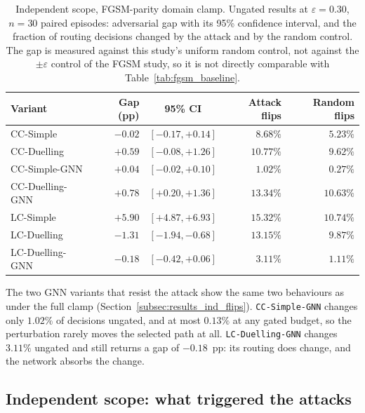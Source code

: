 \begin{table}[htbp]
  \centering
  \caption[Independent scope, FGSM-parity clamp: ungated gaps and flip rates]{%
           Independent scope, FGSM-parity domain clamp. Ungated results at
           $\varepsilon = 0.30$, $n = 30$ paired episodes: adversarial gap with its
           95\% confidence interval, and the fraction of routing decisions changed by
           the attack and by the random control. The gap is measured against this
           study's uniform random control, not against the $\pm\varepsilon$ control of
           the FGSM study, so it is not directly comparable with
           Table~\ref{tab:fgsm_baseline}.}
  \label{tab:ungated_detail_parity}
  \begin{tabular}{lrcrr}
    \hline
    \textbf{Variant} & \textbf{Gap (pp)} & \textbf{95\% CI} & \textbf{Attack flips} & \textbf{Random flips} \\
    \hline
    CC-Simple        & $-0.02$ & $[-0.17, +0.14]$ & $8.68\%$  & $5.23\%$  \\
    CC-Duelling      & $+0.59$ & $[-0.08, +1.26]$ & $10.77\%$ & $9.62\%$  \\
    CC-Simple-GNN    & $+0.04$ & $[-0.02, +0.10]$ & $1.02\%$  & $0.27\%$  \\
    CC-Duelling-GNN  & $+0.78$ & $[+0.20, +1.36]$ & $13.34\%$ & $10.63\%$ \\
    LC-Simple        & $+5.90$ & $[+4.87, +6.93]$ & $15.32\%$ & $10.74\%$ \\
    LC-Duelling      & $-1.31$ & $[-1.94, -0.68]$ & $13.15\%$ & $9.87\%$  \\
    LC-Duelling-GNN  & $-0.18$ & $[-0.42, +0.06]$ & $3.11\%$  & $1.11\%$  \\
    \hline
  \end{tabular}
\end{table}

The two GNN variants that resist the attack show the same two behaviours as under the
full clamp (Section~\ref{subsec:results_ind_flips}). \texttt{CC-Simple-GNN} changes
only $1.02\%$ of decisions ungated, and at most $0.13\%$ at any gated budget, so the
perturbation rarely moves the selected path at all. \texttt{LC-Duelling-GNN} changes
$3.11\%$ ungated and still returns a gap of $-0.18$~pp: its routing does change, and
the network absorbs the change.

\subsection{Independent scope: what triggered the attacks}
\label{subsec:results_parity_triggers}

